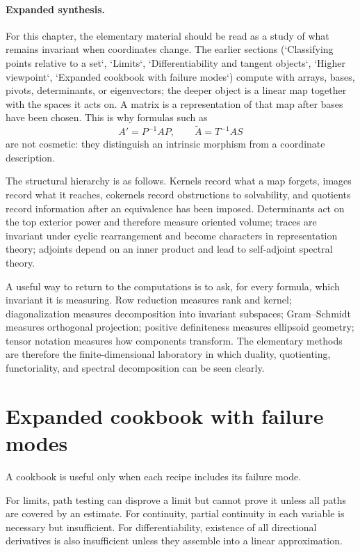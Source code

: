 \paragraph{Expanded synthesis.}
For this chapter, the elementary material should be read as a study of what remains invariant when coordinates change. The earlier sections (`Classifying points relative to a set`, `Limits`, `Differentiability and tangent objects`, `Higher viewpoint`, `Expanded cookbook with failure modes`) compute with arrays, bases, pivots, determinants, or eigenvectors; the deeper object is a linear map together with the spaces it acts on. A matrix is a representation of that map after bases have been chosen. This is why formulas such as
\[
  A' = P^{-1}AP,\qquad \widetilde A = T^{-1}AS
\]
are not cosmetic: they distinguish an intrinsic morphism from a coordinate description.

The structural hierarchy is as follows. Kernels record what a map forgets, images record what it reaches, cokernels record obstructions to solvability, and quotients record information after an equivalence has been imposed. Determinants act on the top exterior power and therefore measure oriented volume; traces are invariant under cyclic rearrangement and become characters in representation theory; adjoints depend on an inner product and lead to self-adjoint spectral theory.

A useful way to return to the computations is to ask, for every formula, which invariant it is measuring. Row reduction measures rank and kernel; diagonalization measures decomposition into invariant subspaces; Gram--Schmidt measures orthogonal projection; positive definiteness measures ellipsoid geometry; tensor notation measures how components transform. The elementary methods are therefore the finite-dimensional laboratory in which duality, quotienting, functoriality, and spectral decomposition can be seen clearly.


\section{Expanded cookbook with failure modes}

A cookbook is useful only when each recipe includes its failure mode.

For limits, path testing can disprove a limit but cannot prove it unless all paths are covered by an estimate.  For continuity, partial continuity in each variable is necessary but insufficient.  For differentiability, existence of all directional derivatives is also insufficient unless they assemble into a linear approximation.

